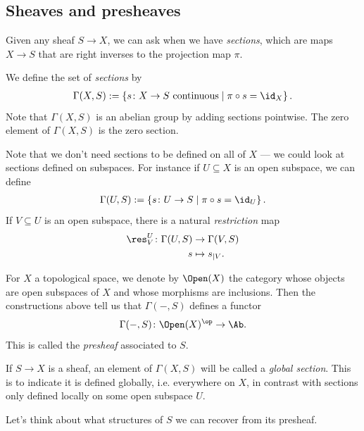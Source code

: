 \documentclass[11pt]{book}
\begin{document}
\subsection{Sheaves and presheaves}

Given any sheaf $S\to X$, we can ask when we have \emph{sections}, which are maps $X \to S$ that are right inverses to the projection map $\pi$.

\begin{definition} We define the set of \emph{sections} by
\begin{align*}
    \Gamma(X,S) := \left\{ s \colon X \to S \text{ continuous} \mid \pi\circ s = \id_X \right\}.
\end{align*}
Note that $\Gamma(X,S)$ is an abelian group by adding sections pointwise. The zero element of $\Gamma(X,S)$ is the zero section.
\end{definition}

Note that we don't need sections to be defined on all of $X$ --- we could look at sections defined on subspaces. For instance if $U \subseteq X$ is an open subspace, we can define
\begin{align*}
    \Gamma(U,S) := \left\{ s \colon U \to S \mid \pi\circ s = \id_U \right\}.
\end{align*}
%
If $V \subseteq U$ is an open subspace, there is a natural \emph{restriction} map
\begin{align*}
    \res_V^U \colon \Gamma(U,S) &\to \Gamma(V,S) \\
    s &\mapsto s_{|V}.
\end{align*}
%
\begin{notation} For $X$ a topological space, we denote by $\Open(X)$ the category whose objects are open subspaces of $X$ and whose morphisms are inclusions. Then the constructions above tell us that $\Gamma(-,S)$ defines a functor
\begin{align*}
    \Gamma(-,S) \colon \Open(X)^\op \to \Ab.
\end{align*}
This is called the \emph{presheaf} associated to $S$.
\end{notation}

\begin{terminology} If $S \to X$ is a sheaf, an element of $\Gamma(X,S)$ will be called a \emph{global section}. This is to indicate it is defined globally, i.e. everywhere on $X$, in contrast with sections only defined locally on some open subspace $U$.
\end{terminology}

Let's think about what structures of $S$ we can recover from its presheaf.
\end{document}
